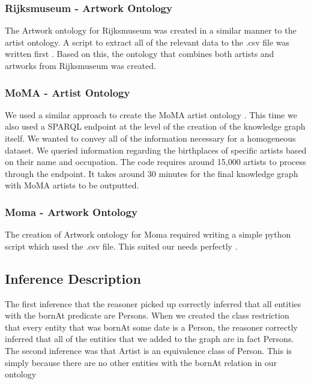 \documentclass{article}
\begin{document}
\subsubsection{Rijksmuseum - Artwork Ontology}
The Artwork ontology for Rijksmuseum was created in a similar manner to the artist ontology. A script to
extract all of the relevant data to the .csv file was written first \cite{Fourth_Github}. Based
on this, the ontology that combines both artists and artworks from Rijksmuseum was created\cite{lolGith2}. 

\subsubsection{MoMA - Artist Ontology}
We used a similar approach to create the MoMA artist ontology \cite{Fith_Github}. This time we also used a
SPARQL endpoint at the level of the creation of the knowledge graph itself. We wanted to
convey all of the information necessary for a homogeneous dataset. We queried information
regarding the birthplaces of specific artists based on their name and occupation. The code
requires around 15,000 artists to process through the endpoint. It takes around 30 minutes for
the final knowledge graph with MoMA artists to be outputted.

\subsubsection{Moma - Artwork Ontology}

The creation of Artwork ontology for Moma required writing a simple python script which used the .csv file. This suited our needs perfectly \cite{Sixth_Github}. 

\newpage
\subsection{Inference Description}

The first inference that the reasoner picked up correctly inferred that all entities with the bornAt
predicate are Persons. When we created the class restriction that every entity that was bornAt
some date is a Person, the reasoner correctly inferred that all of the entities that we added to the
graph are in fact Persons. The second inference was that Artist is an equivalence class of Person. This is simply because
there are no other entities with the bornAt relation in our ontology 
\end{document}
